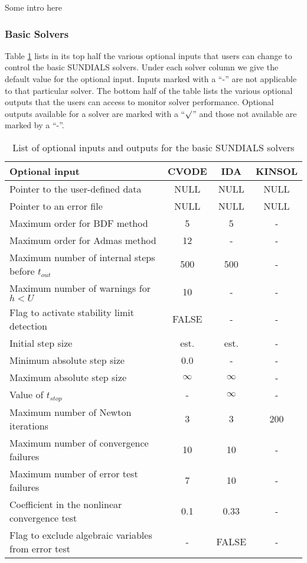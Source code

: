{\sf Some intro here}

\subsubsection*{Basic Solvers} 
Table \ref{t:optional_io} lists in its top half the various optional 
inputs that users can change to control the basic SUNDIALS solvers.
Under each solver column we give the default value for the optional 
input. Inputs marked with a ``-'' are not applicable to that particular 
solver. The bottom half of the table lists the various optional 
outputs that the users can access to monitor solver performance.
Optional outputs available for a solver are marked with a ``$\surd$''
and those not available are marked by a ``-''.

\begin{table}[tp]
\label{t:optional_io}
\centering
\caption{List of optional inputs and outputs for the basic SUNDIALS solvers}
\medskip
\begin{tabular}{|p{2.75in}|c|c|c|}
\hline
{\bf Optional input} & CVODE  & IDA & KINSOL \\
\hline
Pointer to the user-defined data & NULL & NULL& NULL \\
Pointer to an error file & NULL & NULL & NULL \\
Maximum order for BDF method & 5 & 5 & - \\
Maximum order for Admas method& 12  & - & - \\
Maximum number of internal steps before $t_{out}$ & 500 & 500 & - \\
Maximum number of warnings for $h < U$ & 10 & - & - \\
Flag to activate stability limit detection & FALSE & - & - \\
Initial step size & est. & est. & - \\
Minimum absolute step size & 0.0 & - & - \\
Maximum absolute step size & $\infty$ & $\infty$ & - \\
Value of $t_{stop}$ & - & $\infty$ & - \\
Maximum number of Newton iterations & 3 & 3 & 200 \\
Maximum number of convergence failures & 10 & 10 & - \\
Maximum number of error test failures & 7 & 10 & - \\
Coefficient in the nonlinear convergence test & 0.1 & 0.33 & - \\
Flag to exclude algebraic variables from error test & - & FALSE & - \\

\end{tabular}
\end{table}
